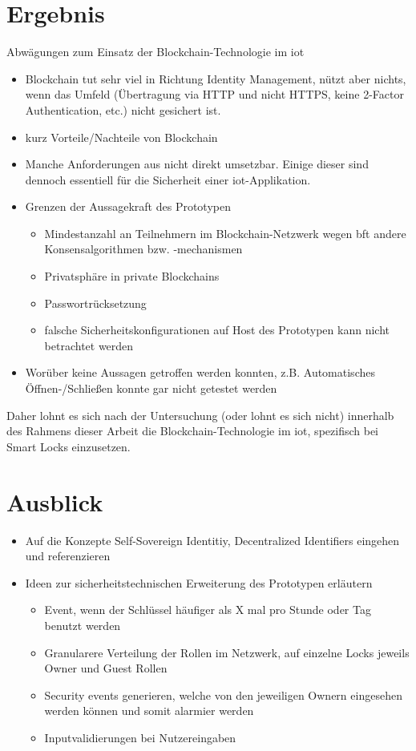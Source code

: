 \section{Ergebnis}
\label{sec:end}
    Abwägungen zum Einsatz der Blockchain-Technologie im \gls{iot}
    \begin{itemize}[noitemsep]
        \item Blockchain tut sehr viel in Richtung Identity Management, nützt aber nichts, wenn das Umfeld (Übertragung via HTTP und nicht HTTPS, keine 2-Factor Authentication, etc.) nicht gesichert ist.
        \item kurz Vorteile/Nachteile von Blockchain
        \item Manche Anforderungen aus  nicht direkt umsetzbar.
            Einige dieser sind dennoch essentiell für die Sicherheit einer \gls{iot}-Applikation.
        \item Grenzen der Aussagekraft des Prototypen
		    \begin{itemize}[noitemsep]
		        \item Mindestanzahl an Teilnehmern im Blockchain-Netzwerk wegen \gls{bft} \textrightarrow andere Konsensalgorithmen bzw. -mechanismen
		        \item Privatsphäre in private Blockchains
		        \item Passwortrücksetzung
		        \item falsche Sicherheitskonfigurationen auf Host des Prototypen kann nicht betrachtet werden
		    \end{itemize}
		\item Worüber keine Aussagen getroffen werden konnten, z.B. Automatisches Öffnen-/\-Schließen konnte gar nicht getestet werden
    \end{itemize}
    Daher lohnt es sich nach der Untersuchung (oder lohnt es sich nicht) innerhalb des Rahmens dieser Arbeit die Blockchain-Technologie im \gls{iot}, spezifisch bei Smart Locks einzusetzen.
    
    
\section{Ausblick}
\label{sec:end_further}
	\begin{itemize}[noitemsep]
		\item Auf die Konzepte Self-Sovereign Identitiy, Decentralized Identifiers eingehen und referenzieren
		\item Ideen zur sicherheitstechnischen Erweiterung des Prototypen erläutern
		\begin{itemize}[noitemsep]
		    \item Event, wenn der Schlüssel häufiger als X mal pro Stunde oder Tag benutzt werden
		    \item Granularere Verteilung der Rollen im Netzwerk, auf einzelne Locks jeweils Owner und Guest Rollen
		    \item Security events generieren, welche von den jeweiligen Ownern eingesehen werden können und somit alarmier werden
		    \item Inputvalidierungen bei Nutzereingaben
		\end{itemize}
	\end{itemize}

